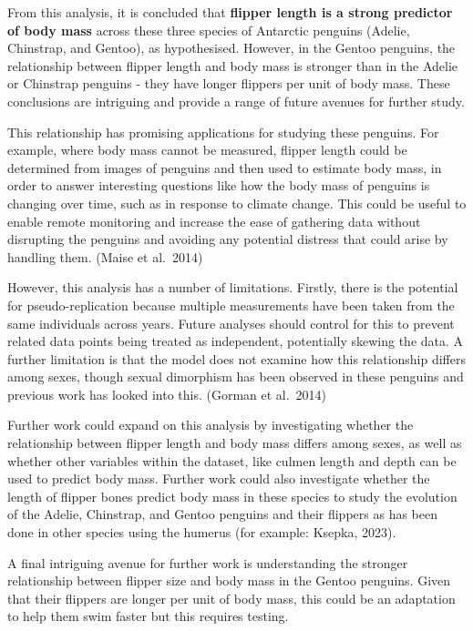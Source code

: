 \documentclass[
]{article}
\begin{document}
From this analysis, it is concluded that \textbf{flipper length is a
strong predictor of body mass} across these three species of Antarctic
penguins (Adelie, Chinstrap, and Gentoo), as hypothesised. However, in
the Gentoo penguins, the relationship between flipper length and body
mass is stronger than in the Adelie or Chinstrap penguins - they have
longer flippers per unit of body mass. These conclusions are intriguing
and provide a range of future avenues for further study.

This relationship has promising applications for studying these
penguins. For example, where body mass cannot be measured, flipper
length could be determined from images of penguins and then used to
estimate body mass, in order to answer interesting questions like how
the body mass of penguins is changing over time, such as in response to
climate change. This could be useful to enable remote monitoring and
increase the ease of gathering data without disrupting the penguins and
avoiding any potential distress that could arise by handling them.
(Maise et al.~2014)

However, this analysis has a number of limitations. Firstly, there is
the potential for pseudo-replication because multiple measurements have
been taken from the same individuals across years. Future analyses
should control for this to prevent related data points being treated as
independent, potentially skewing the data. A further limitation is that
the model does not examine how this relationship differs among sexes,
though sexual dimorphism has been observed in these penguins and
previous work has looked into this. (Gorman et al.~2014)

Further work could expand on this analysis by investigating whether the
relationship between flipper length and body mass differs among sexes,
as well as whether other variables within the dataset, like culmen
length and depth can be used to predict body mass. Further work could
also investigate whether the length of flipper bones predict body mass
in these species to study the evolution of the Adelie, Chinstrap, and
Gentoo penguins and their flippers as has been done in other species
using the humerus (for example: Ksepka, 2023).

A final intriguing avenue for further work is understanding the stronger
relationship between flipper size and body mass in the Gentoo penguins.
Given that their flippers are longer per unit of body mass, this could
be an adaptation to help them swim faster but this requires testing.
\end{document}
